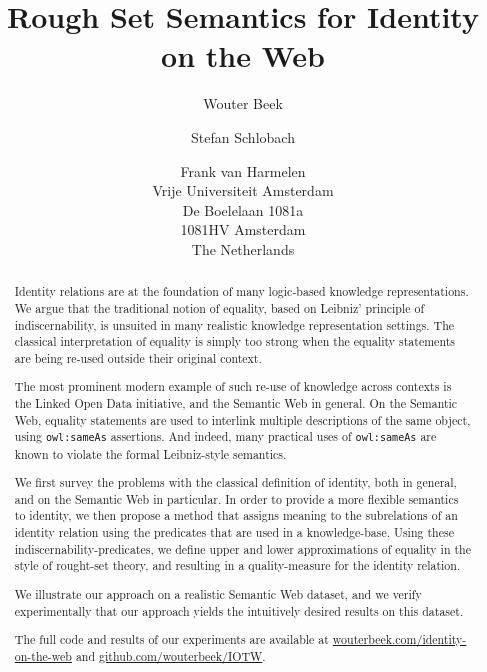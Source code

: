 \documentclass[letterpaper]{article}
\author{
  Wouter Beek \and Stefan Schlobach \and Frank van Harmelen\\
  Vrije Universiteit Amsterdam\\
  De Boelelaan 1081a\\
  1081HV Amsterdam\\
  The Netherlands
}
\title{Rough Set Semantics for Identity on the Web}
\newcommand{\URL}[1]{{\small \url{#1}}}
\begin{document}
\maketitle
\begin{abstract}
Identity relations are at the foundation of many logic-based knowledge representations.
We argue that the traditional notion of equality, based on Leibniz' principle of indiscernability,
is unsuited in many realistic knowledge representation settings. The classical  interpretation of equality
is simply too strong when the equality statements are being re-used outside their original context. 

The most prominent modern example of such re-use of knowledge across contexts is the 
Linked Open Data initiative, and the Semantic Web in general. On the Semantic Web,
equality statements are used to interlink multiple descriptions of the same object, 
using \verb|owl:sameAs| assertions. And indeed, many practical uses 
of \verb|owl:sameAs| are known to violate the formal Leibniz-style semantics.

We first survey the problems with the classical definition of identity, both in general, 
and on the Semantic Web in particular. 
In order to provide a more flexible semantics to identity, 
we then propose a method that assigns meaning to the subrelations of
an identity relation using the predicates that are used in a knowledge-base.
Using these indiscernability-predicates, we define upper and lower approximations 
of equality in the style of rought-set theory, and resulting in a quality-measure for the identity relation. 

We illustrate our approach on a realistic Semantic Web dataset, and we
verify experimentally that our approach yields the intuitively desired
results on this dataset. 

The full code and results of our experiments are available at
\URL{wouterbeek.com/identity-on-the-web} and
\URL{github.com/wouterbeek/IOTW}.



\end{abstract}














%



\end{document}
